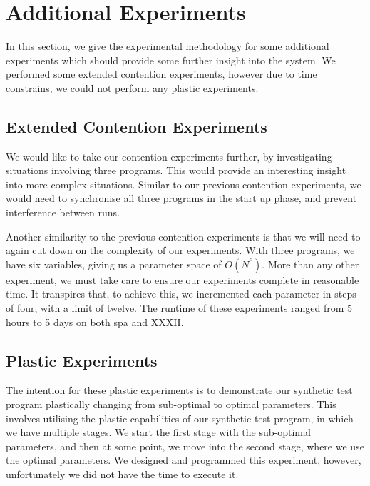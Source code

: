 \section{Additional Experiments}
\label{section:experimental_methodology:additional_experiments}

In this section, we give the experimental methodology for some additional experiments which should provide some further insight into the system. We performed some extended contention experiments, however due to time constrains, we could not perform any plastic experiments.



\subsection{Extended Contention Experiments}
\label{section:experimental_methodology:extended_contention_experiments}

We would like to take our contention experiments further, by investigating situations involving three programs. This would provide an interesting insight into more complex situations. Similar to our previous contention experiments, we would need to synchronise all three programs in the start up phase, and prevent interference between runs. 

Another similarity to the previous contention experiments is that we will need to again cut down on the complexity of our experiments. With three programs, we have six variables, giving us a parameter space of $O(N^6)$. More than any other experiment, we must take care to ensure our experiments complete in reasonable time. It transpires that, to achieve this, we incremented each parameter in steps of four, with a limit of twelve. The runtime of these experiments ranged from 5 hours to 5 days on both spa and XXXII.



\subsection{Plastic Experiments}
\label{section:experimental_methodology:plastic_experiment}

The intention for these plastic experiments is to demonstrate our synthetic test program plastically changing from sub-optimal to optimal parameters. This involves utilising the plastic capabilities of our synthetic test program, in which we have multiple stages. We start the first stage with the sub-optimal parameters, and then at some point, we move into the second stage, where we use the optimal parameters. We designed and programmed this experiment, however, unfortunately we did not have the time to execute it.



